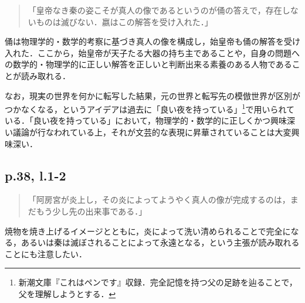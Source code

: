 \documentclass[10pt, a5paper, twoside]{jsarticle}
\theoremstyle{definition}
\begin{document}
		\begin{quote}
			
			「皇帝なき秦の姿こそが真人の像であるというのが俑の答えで，存在しないものは滅びない．嬴はこの解答を受け入れた．」

		\end{quote}

		俑は物理学的・数学的考察に基づき真人の像を構成し，始皇帝も俑の解答を受け入れた．ここから，始皇帝が天子たる大器の持ち主であることや，自身の問題への数学的・物理学的に正しい解答を正しいと判断出来る素養のある人物であることが読み取れる．

		なお，現実の世界を何かに転写した結果，元の世界と転写先の模倣世界が区別がつかなくなる，というアイデアは過去に「良い夜を持っている」\footnote{新潮文庫『これはペンです』収録．完全記憶を持つ父の足跡を辿ることで，父を理解しようとする．}で用いられている．「良い夜を持っている」において，物理学的・数学的に正しくかつ興味深い議論が行なわれている上，それが文芸的な表現に昇華されていることは大変興味深い．

		\subsection{p.38, l.1-2}

		\begin{quote}

			「阿房宮が炎上し，その炎によってようやく真人の像が完成するのは，まだもう少し先の出来事である．」

		\end{quote}

		焼物を焼き上げるイメージとともに，炎によって洗い清められることで完全になる，あるいは秦は滅ぼされることによって永遠となる，という主張が読み取れることにも注意したい．
\end{document}
